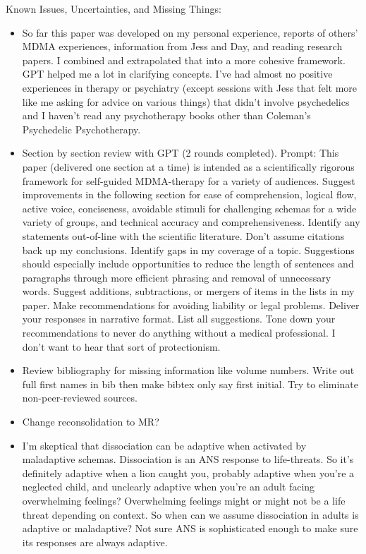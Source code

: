 \documentclass[12pt,letterpaper]{article}
\begin{document}
Known Issues, Uncertainties, and Missing Things:
\begin{itemize}
    \item So far this paper was developed on my personal experience, reports of others' MDMA experiences, information from Jess and Day, and reading research papers. I combined and extrapolated that into a more cohesive framework. GPT helped me a lot in clarifying concepts. I've had almost no positive experiences in therapy or psychiatry (except sessions with Jess that felt more like me asking for advice on various things) that didn't involve psychedelics and I haven't read any psychotherapy books other than Coleman's Psychedelic Psychotherapy.
    \item Section by section review with GPT (2 rounds completed). Prompt:
        This paper (delivered one section at a time) is intended as a scientifically rigorous framework for self-guided MDMA-therapy for a variety of audiences.
        Suggest improvements in the following section for ease of comprehension, logical flow, active voice, conciseness, avoidable stimuli for challenging schemas for a wide variety of groups, and technical accuracy and comprehensiveness.
        Identify any statements out-of-line with the scientific literature. Don't assume citations back up my conclusions. Identify gaps in my coverage of a topic.
        Suggestions should especially include opportunities to reduce the length of sentences and paragraphs through more efficient phrasing and removal of unnecessary words.
        Suggest additions, subtractions, or mergers of items in the lists in my paper.
        Make recommendations for avoiding liability or legal problems.
        Deliver your responses in narrative format. List all suggestions.
        Tone down your recommendations to never do anything without a medical professional. I don't want to hear that sort of protectionism.
    \item Review bibliography for missing information like volume numbers. Write out full first names in bib then make bibtex only say first initial. Try to eliminate non-peer-reviewed sources.
    \item Change reconsolidation to MR?
    \item I'm skeptical that dissociation can be adaptive when activated by maladaptive schemas. Dissociation is an ANS response to life-threats. So it's definitely adaptive when a lion caught you, probably adaptive when you're a neglected child, and unclearly adaptive when you're an adult facing overwhelming feelings? Overwhelming feelings might or might not be a life threat depending on context. So when can we assume dissociation in adults is adaptive or maladaptive? Not sure ANS is sophisticated enough to make sure its responses are always adaptive.

\end{itemize}
\end{document}
